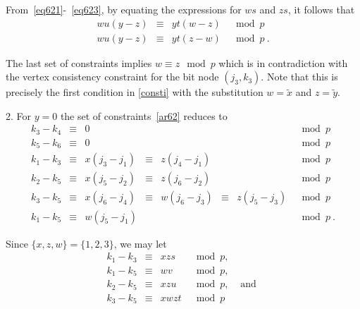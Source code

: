 From~\eqref{eq621}-~\eqref{eq623}, by equating the expressions for
$ws$ and $zs$, it follows that
\begin{equation}\begin{array}{cccc}
wu(y-z) &\equiv &yt(w-z) &\mod p \\
wu(y-z) &\equiv &yt(z-w) &\mod p~.
\end{array}\end{equation}

The last set of constraints implies $w\equiv z \mod p$ which is in
contradiction with the vertex consistency constraint for the bit
node $(j_3,k_3)$. Note that this is precisely the first condition
in \eqref{consti} with the substitution $w=\tilde{x}$ and
$z=\tilde{y}$.

2. For $y=0$ the set of constraints~\eqref{ar62} reduces to
\begin{equation}\begin{array}{cccccccccc}
k_3-k_4 &\equiv& 0 & {}& {}&{}&{}&\mod p
\\
k_5-k_6 &\equiv& 0 & {}& {}&{}&{}&\mod p\\
k_1-k_3 &\equiv& x(j_3-j_1)& \equiv& z(j_4-j_1)& {} &{}&\mod p
\\
k_2-k_5 &\equiv& x(j_5-j_2) &\equiv&  z(j_6-j_2) &{}&{} &\mod
p\\
k_3-k_5 &\equiv& x(j_6-j_4) &\equiv& w(j_6-j_3) &
\equiv& z(j_5-j_3)&\mod p\\
k_1-k_5 &\equiv& w(j_5-j_1) & {} & {} &{}&{}&\mod p~.
\end{array}\end{equation}

Since $\{x,z,w\}=\{1,2,3\}$, we may let
\begin{equation}\begin{array}{ccccc}k_1-k_3 &\equiv& xzs &\mod p, &{} \\
k_1-k_5 &\equiv & wv &\mod p, &{}\\ k_2-k_5 &\equiv& xzu &\mod p,
&\text{ and }\\k_3-k_5 &\equiv& xwzt &\mod p&{}
\end{array}\end{equation}

